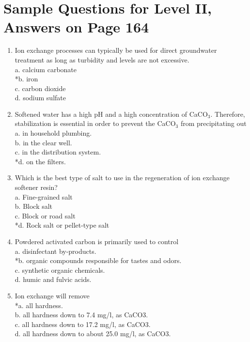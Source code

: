 \section{Sample Questions for Level II, Answers on Page 164}
\begin{enumerate}[label=TII-\arabic*]
\item Ion exchange processes can typically be used for direct groundwater treatment as long as turbidity and levels are not excessive.\\
a. calcium carbonate\\
*b. iron\\
c. carbon dioxide\\
d. sodium sulfate \\
\item Softened water has a high pH and a high concentration of CaCO$_{3}$. Therefore, stabilization is essential in order to prevent the CaCO$_{3}$ from precipitating out\\
a. in household plumbing.\\
b. in the clear well.\\
c. in the distribution system.\\
*d. on the filters.\\
\item Which is the best type of salt to use in the regeneration of ion exchange softener resin?\\
a. Fine-grained salt\\
b. Block salt\\
c. Block or road salt\\
*d. Rock salt or pellet-type salt\\
\item Powdered activated carbon is primarily used to control\\
a. disinfectant by-products.\\
*b. organic compounds responsible for tastes and odors.\\
c. synthetic organic chemicals.\\
d. humic and fulvic acids.\\
\item Ion exchange will remove\\
*a. all hardness.\\
b. all hardness down to 7.4 mg/l, as CaCO3.\\
c. all hardness down to 17.2 mg/l, as CaCO3.\\
d. all hardness down to about 25.0 mg/l, as CaCO3.\\
\end{enumerate}
